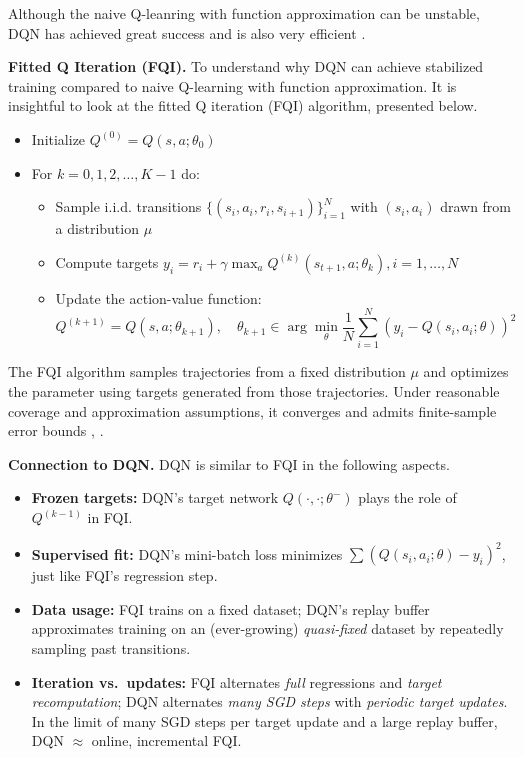 \documentclass[
]{book}
\providecommand{\tightlist}{%
  \setlength{\itemsep}{0pt}\setlength{\parskip}{0pt}}
\theoremstyle{definition}
\theoremstyle{definition}
\theoremstyle{definition}
\theoremstyle{definition}
\theoremstyle{remark}
\begin{document}
Although the naive Q-leanring with function approximation can be unstable, DQN has achieved great success and is also very efficient \citep{mnih2015human}.

\textbf{Fitted Q Iteration (FQI).} To understand why DQN can achieve stabilized training compared to naive Q-learning with function approximation. It is insightful to look at the fitted Q iteration (FQI) algorithm, presented below.

\begin{itemize}
\tightlist
\item
  Initialize \(Q^{(0)} = Q(s,a;\theta_0)\)
\item
  For \(k=0,1,2,\dots,K-1\) do:

  \begin{itemize}
  \tightlist
  \item
    Sample i.i.d. transitions \(\{ (s_i,a_i,r_i,s_{i+1}) \}_{i=1}^N\) with \((s_i, a_i)\) drawn from a distribution \(\mu\)
  \item
    Compute targets \(y_i = r_i + \gamma \max_a Q^{(k)}(s_{t+1},a;\theta_k),i=1,\dots,N\)
  \item
    Update the action-value function:
    \[
    Q^{(k+1)} = Q(s,a;\theta_{k+1}), \quad \theta_{k+1} \in \arg\min_{\theta}  \frac{1}{N} \sum_{i=1}^N (y_i - Q(s_i,a_i;\theta))^2
    \]
  \end{itemize}
\end{itemize}

The FQI algorithm samples trajectories from a fixed distribution \(\mu\) and optimizes the parameter using targets generated from those trajectories. Under reasonable coverage and approximation assumptions, it converges and admits finite-sample error bounds \citep{antos2007fitted}, \citep{munos2008finite}.

\textbf{Connection to DQN.} DQN is similar to FQI in the following aspects.

\begin{itemize}
\item
  \textbf{Frozen targets:} DQN's target network \(Q(\cdot,\cdot; \theta^-)\) plays the role of \(Q^{(k-1)}\) in FQI.
\item
  \textbf{Supervised fit:} DQN's mini-batch loss minimizes \(\sum (Q(s_i,a_i; \theta) - y_i)^2\), just like FQI's regression step.
\item
  \textbf{Data usage:} FQI trains on a fixed dataset; DQN's replay buffer approximates training on an (ever-growing) \emph{quasi-fixed} dataset by repeatedly sampling past transitions.
\item
  \textbf{Iteration vs.~updates:} FQI alternates \emph{full} regressions and \emph{target recomputation}; DQN alternates \emph{many SGD steps} with \emph{periodic target updates}. In the limit of many SGD steps per target update and a large replay buffer, DQN \(\approx\) online, incremental FQI.
\end{itemize}
\end{document}
